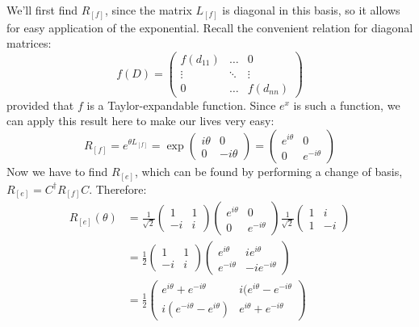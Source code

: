 \documentclass[10pt]{article}
\begin{document}
\begin{enumerate}[label=\alph*)]
			\begin{solution}
				We'll first find $R_{[f]}$, since the matrix $L_{[f]}$ is diagonal in this basis, so it allows
				for easy application of the exponential. Recall the convenient relation for diagonal matrices:
				\[
					f(D) = \begin{pmatrix} f(d_{11}) & \dots &0 \\
					\vdots & \ddots & \vdots \\
					0& \dots & f(d_{nn})\end{pmatrix} 
				\] 
				provided that $f$ is a Taylor-expandable function. Since $e^x$ is such a function, we can 
				apply this result here to make our lives very easy:
				\[
					R_{[f]}= e^{\theta L_{[f]}} = \exp{\begin{pmatrix} i \theta & 0\\0 & -i\theta \end{pmatrix} }
					= \begin{pmatrix} e^{i \theta} & 0 \\ 0 & e^{-i \theta}\end{pmatrix} 
				\] 
				Now we have to find $R_{[e]}$, which can be found by performing a change of basis, $R_{[e]} = 
				C^\dagger R_{[f]} C$. Therefore:
				\begin{align*}
					R_{[e]}(\theta) &= \frac{1}{\sqrt{2} }\begin{pmatrix} 1&1\\-i&i \end{pmatrix} \begin{pmatrix} e^{i \theta} & 0 \\ 0 & e^{- i \theta} \end{pmatrix} \frac{1}{\sqrt{2} }\begin{pmatrix} 1 & i\\ 1& -i \end{pmatrix} \\
									&= \frac{1}{2}\begin{pmatrix} 1&1\\-i&i \end{pmatrix} \begin{pmatrix} e^{i \theta}&ie^{i \theta} \\ e^{-i\theta} & -ie^{- i \theta}  \end{pmatrix}  \\
									&= \frac{1}{2}\begin{pmatrix} e^{i \theta} + e^{-i \theta} & i(e^{i \theta} - e^{- i \theta}\\ i(e^{-i \theta} - e^{i \theta}) & e^{i \theta} + e^{- i \theta} \end{pmatrix}  

\end{align*}
\end{solution}
\end{enumerate}
\end{document}
